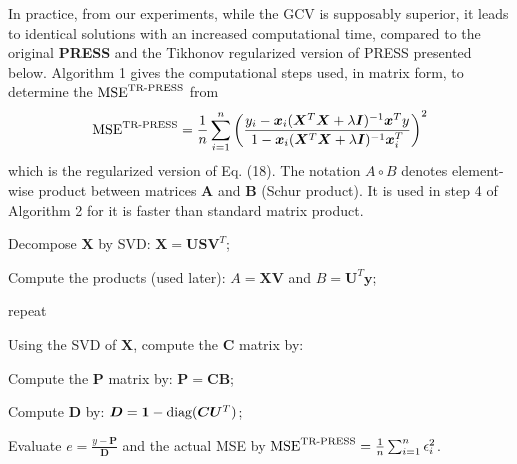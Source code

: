 In practice, from our experiments, while the GCV is supposably superior, it leads to identical solutions with an increased computational time, compared to the original \textbf{PRESS} and the Tikhonov regularized version of PRESS presented below. Algorithm 1 gives the computational steps used, in matrix form, to determine the $\textup{MSE}^{\textup{TR-PRESS}}$ from
\begin{align}
  \textup{MSE}^{\textup{TR-PRESS}}=\frac 1 n \sum_{i=1}^n \left( \frac{y_i-\bm x_i(\bm X^T \bm X+\lambda \bm I)^{-1}\bm x^T y  }
       {1-\bm x_i(\bm X^T \bm X+\lambda \bm I)^{-1}\bm x_i^T}\right)^2
\end{align}
which is the regularized version of Eq. (18). The notation $A\circ B$ denotes element-wise product between matrices $\bm A$ and $\bm B$ (Schur product). It is used in step 4 of Algorithm 2 for it is faster than standard matrix product.

Decompose $\bm X$ by SVD: $\bm X = \bm U\bm S\bm V^T$;

Compute the products (used later): $A = \bm X\bm V$ and $B = \bm U^T\bm y$;

repeat

Using the SVD of $\bm X$, compute the $\bm C$ matrix by:

Compute the $\bm P$ matrix by: $\bm P = \bm C\bm B$;

Compute $\bm D$ by: $\bm D = \bm 1-\textup{diag}(\bm C\bm U^T)$;

Evaluate $e = \frac{y-\bm P} {\bm D}$ and the actual  MSE by $\textup{MSE}^{\textup{TR-PRESS}}=\frac 1 n \sum_{i=1}^n \epsilon_i^2$.

